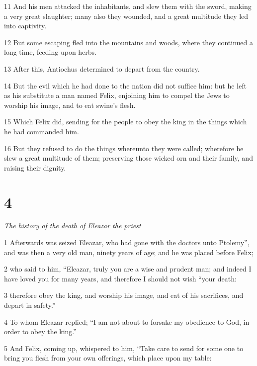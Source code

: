 \par 11 And his men attacked the inhabitants, and slew them with the sword, making a very great slaughter; many also they wounded, and a great multitude they led into captivity. 

\par 12 But some escaping fled into the mountains and woods, where they continued a long time, feeding upon herbs. 

\par 13 After this, Antiochus determined to depart from the country. 

\par 14 But the evil which he had done to the nation did not suffice him: but he left as his substitute a man named Felix, enjoining him to compel the Jews to worship his image, and to eat swine’s flesh. 

\par 15 Which Felix did, sending for the people to obey the king in the things which he had commanded him. 

\par 16 But they refused to do the things whereunto they were called; wherefore he slew a great multitude of them; preserving those wicked orn and their family, and raising their dignity.

\chapter{4}

\par \textit{The history of the death of Eleazar the priest}

\par 1 Afterwards was seized Eleazar, who had gone with the doctors unto Ptolemy”, and was then a very old man, ninety years of age; and he was placed before Felix; 

\par 2 who said to him, “Eleazar, truly you are a wise and prudent man; and indeed I have loved you for many years, and therefore I should not wish “your death: 

\par 3 therefore obey the king, and worship his image, and eat of his sacrifices, and depart in safety.” 

\par 4 To whom Eleazar replied; “I am not about to forsake my obedience to God, in order to obey the king.” 

\par 5 And Felix, coming up, whispered to him, “Take care to send for some one to bring you flesh from your own offerings, which place upon my table: 

